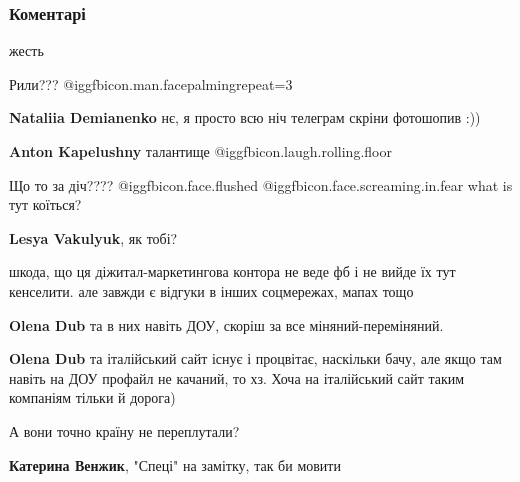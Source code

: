  
 
 
 
 
\subsubsection{Коментарі}

\begin{itemize} %
жесть

Рили??? @igg{fbicon.man.facepalming}{repeat=3} 

\begin{itemize} %
\textbf{Nataliia Demianenko} нє, я просто всю ніч телеграм скріни фотошопив :))

\textbf{Anton Kapelushny} талантище @igg{fbicon.laugh.rolling.floor} 
\end{itemize} %

Що то за діч????  @igg{fbicon.face.flushed}  @igg{fbicon.face.screaming.in.fear}  what is тут коїться?

\textbf{Lesya Vakulyuk}, як тобі?

шкода, що ця діжитал-маркетингова контора не веде фб і не вийде їх тут кенселити. але завжди є відгуки в інших соцмережах, мапах тощо

\begin{itemize} %
\textbf{Olena Dub} та в них навіть ДОУ, скоріш за все міняний-переміняний.

\textbf{Olena Dub} та італійський сайт існує і процвітає, наскільки бачу, але якщо там навіть на ДОУ профайл не качаний, то хз. Хоча на італійський сайт таким компаніям тільки й дорога)
\end{itemize} %

А вони точно країну не переплутали?

\textbf{Катерина Венжик}, "Спеці" на замітку, так би мовити





\end{itemize}
